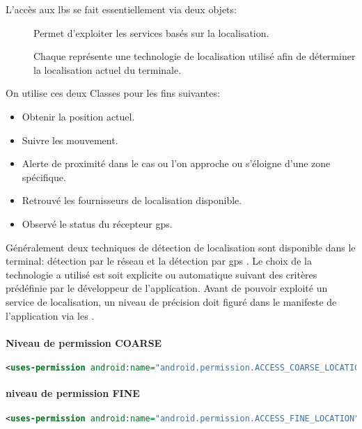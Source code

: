 L'accès aux \gls{lbs} se fait essentiellement via deux objets:
\begin{description}
\item [] Permet d'exploiter les services basés sur la localisation.
\item [] Chaque  représente une technologie de localisation utilisé afin de déterminer la localisation actuel du terminale.

\end{description}
On utilise ces deux Classes pour les fins suivantes:
\begin{itemize}
\item Obtenir la position actuel.
\item Suivre les mouvement.
\item Alerte de proximité dans le cas ou l'on approche ou s’éloigne d'une zone spécifique.
\item Retrouvé les fournisseurs de localisation disponible.
\item Observé le status du récepteur \gls{gps}.
\end{itemize}
Généralement deux techniques de détection de localisation sont disponible dans le terminal: détection par le réseau  et la détection par \gls{gps} . Le choix de la technologie a utilisé est soit explicite ou automatique suivant des critères prédéfinie par le développeur de l'application. Avant de pouvoir exploité un service de localisation, un niveau de précision doit figuré dans le manifeste de l'application via les  .

\paragraph{Niveau de permission \textbf{COARSE} } %
\label{par:coarse}

\begin{lstlisting}[language=xml, caption=permission pour la localisation par le réseau.]
<uses-permission android:name="android.permission.ACCESS_COARSE_LOCATION"/>
\end{lstlisting}

\paragraph{niveau de permission \textbf{FINE} } %
\label{par:fine}

\begin{lstlisting}[language=xml, caption=permission pour la localisation par GPS.]
<uses-permission android:name="android.permission.ACCESS_FINE_LOCATION"/>
\end{lstlisting}

